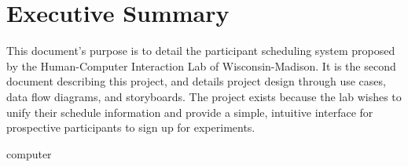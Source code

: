 \newcommand{\puttitle}{Milestone 3}


\section{Executive Summary}
This document's purpose is to detail the participant scheduling system proposed by the Human-Computer Interaction Lab of Wisconsin-Madison. It is the second document describing this project, and details project design through use cases, data flow diagrams, and storyboards.  The project exists because the lab wishes to unify their schedule information and provide a simple, intuitive interface for prospective participants to sign up for experiments.

\gls{computer}





